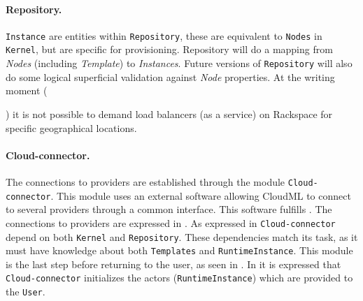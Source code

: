 \paragraph{Repository.} 

\texttt{Instance} are entities within \texttt{Repository},
these are equivalent to \texttt{Nodes} in \texttt{Kernel},
but are specific for provisioning.
Repository will do a mapping from \emph{Nodes} (including \emph{Template})
to \emph{Instances}. Future versions of \texttt{Repository} will also do some logical superficial validation
against \emph{Node} properties.
At the writing moment (\date{April 2012}) it is not possible to 
demand load balancers (as a service) on Rackspace for specific geographical locations.

\paragraph{Cloud-connector.}

The connections to providers are established through the module \texttt{Cloud-connector}.
This module uses an external software allowing CloudML to connect to several providers
through a common interface.
This software fulfills .
The connections to providers are expressed in .
As expressed in  \texttt{Cloud-connector}
depend on both \texttt{Kernel} and \texttt{Repository}.
These dependencies match its task, as it must have knowledge about both 
\texttt{Templates} and \texttt{RuntimeInstance}.
This module is the last step before returning to the user, as seen in .
In  it is expressed that \texttt{Cloud-connector} initializes
the actors (\texttt{RuntimeInstance}) which are provided to the \texttt{User}.
